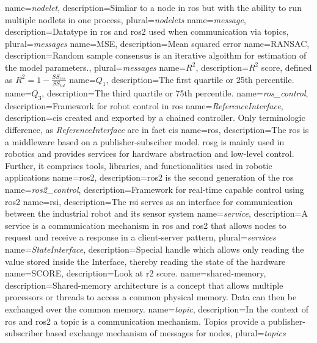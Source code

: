 {
    name={\textit{nodelet}},
    description={Simliar to a \gls{node} in \gls{ros} but with the ability to run multiple nodlets in one process},
    plural={\textit{nodelets}}
}
{
    name={\textit{message}},
    description={Datatype in \gls{ros} and \gls{ros2} used when communication via \glspl{topic}},
    plural={\textit{messages}}
}
{
    name={MSE},
    description={Mean squared error}
}
{
    name={RANSAC},
    description={Random sample consensus is an iterative algoithm for estimation of the model parameters.},
    plural={\textit{messages}}
}
{
    name={$R^2$},
    description={$R^2$ score, defined as $R^2 = 1 - \frac{SS_{res}}{SS_{tot}}$}
}
{
    name={$Q_1$},
    description={The first quartile or 25th percentile.}
}
{
    name={$Q_3$},
    description={The third quartile or 75th percentile.}
}
{
    name={\textit{ros\_control}},
    description={Framework for robot control in \gls{ros}}
}
{
    name={\textit{ReferenceInterface}},
    description={\Glspl{ci} created and exported by a chained controller. Only terminologic difference, as \textit{ReferenceInterface} are in fact \glspl{ci}}
}
{
    name={\gls{ros}},
    description={The \acrlong{ros} is a middleware based on a publisher-subsciber model. \gls{rosg} is mainly used in robotics and provides services for hardware abstraction and low-level control. Further, it comprises tools, libraries, and functionalities used in robotic applications}
}
{
    name={\gls{ros2}},
    description={\acrlong{ros2} is the second generation of the \acrlong{ros} \cite{macenski_robot_2022}}
}
{
    name={\textit{ros2\_control}},
    description={Framework for real-time capable control using \gls{ros2}}
}
{
    name={\gls{rsi}},
    description={The \acrlong{rsi} serves as an interface for communication between the industrial robot and its sensor system }
}
{
    name={\textit{service}},
    description={A service is a communication mechanism in \gls{ros} and \gls{ros2} that allows \glspl{node} to request and receive a response in a client-server pattern},
    plural={\textit{services}}
}
{
    name={\textit{StateInterface}},
    description={Special \gls{handle} which allows only reading the value stored inside the Interface, thereby reading the state of the hardware}
}
{
    name={SCORE},
    description={Look at \gls{r2} score.}
}
{
    name={shared-memory},
    description={Shared-memory architecture is a concept that allows multiple processors or threads to access a common physical memory. Data can then be exchanged over the common memory. }
}
{
    name={\textit{topic}},
    description={In the context of \gls{ros} and \gls{ros2} a topic is a communication mechanism. Topics provide a publisher-subscriber based exchange mechanism of \glspl{message} for \glspl{node}},
    plural={\textit{topics}}
}